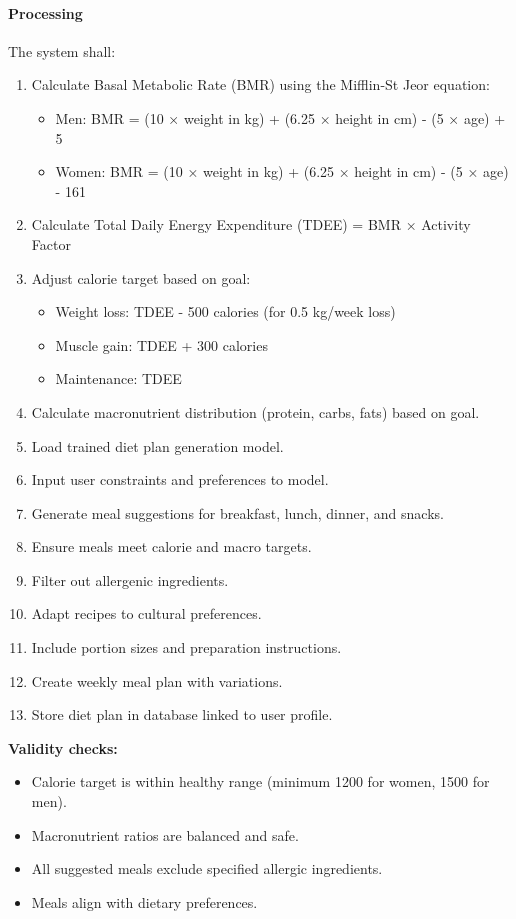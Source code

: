 \documentclass[12pt,a4paper]{article}
\begin{document}
\paragraph{Processing}
The system shall:
\begin{enumerate}
    \item Calculate Basal Metabolic Rate (BMR) using the Mifflin-St Jeor equation:
    \begin{itemize}
        \item Men: BMR = (10 × weight in kg) + (6.25 × height in cm) - (5 × age) + 5
        \item Women: BMR = (10 × weight in kg) + (6.25 × height in cm) - (5 × age) - 161
    \end{itemize}
    \item Calculate Total Daily Energy Expenditure (TDEE) = BMR × Activity Factor
    \item Adjust calorie target based on goal:
    \begin{itemize}
        \item Weight loss: TDEE - 500 calories (for 0.5 kg/week loss)
        \item Muscle gain: TDEE + 300 calories
        \item Maintenance: TDEE
    \end{itemize}
    \item Calculate macronutrient distribution (protein, carbs, fats) based on goal.
    \item Load trained diet plan generation model.
    \item Input user constraints and preferences to model.
    \item Generate meal suggestions for breakfast, lunch, dinner, and snacks.
    \item Ensure meals meet calorie and macro targets.
    \item Filter out allergenic ingredients.
    \item Adapt recipes to cultural preferences.
    \item Include portion sizes and preparation instructions.
    \item Create weekly meal plan with variations.
    \item Store diet plan in database linked to user profile.
\end{enumerate}

\textbf{Validity checks:}
\begin{itemize}
    \item Calorie target is within healthy range (minimum 1200 for women, 1500 for men).
    \item Macronutrient ratios are balanced and safe.
    \item All suggested meals exclude specified allergic ingredients.
    \item Meals align with dietary preferences.
\end{itemize}
\end{document}
